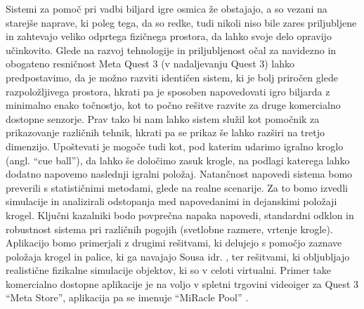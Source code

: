 \documentclass[a4paper, 12pt]{article}
\newcommand\cmnt[1]{\textcolor{munsell}{#1}}
\begin{document}
Sistemi za pomoč pri vadbi biljard igre osmica že obstajajo, a so vezani na starejše naprave, ki poleg tega, da so redke, tudi nikoli niso bile zares priljubljene \cite{Sousa2016} in zahtevajo veliko odprtega fizičnega prostora, da lahko svoje delo opravijo učinkovito. Glede na razvoj tehnologije in priljubljenost očal za navidezno in obogateno resničnost Meta Quest 3 (v nadaljevanju Quest 3) lahko predpostavimo, da je možno razviti identičen sistem, ki je bolj priročen glede razpoložljivega prostora, hkrati pa je sposoben napovedovati igro biljarda z minimalno enako točnostjo, kot to počno rešitve razvite za druge komercialno dostopne senzorje. Prav tako bi nam lahko sistem služil kot pomočnik za prikazovanje različnih tehnik, hkrati pa se prikaz še lahko razširi na tretjo dimenzijo. Upoštevati je mogoče tudi kot, pod katerim udarimo igralno kroglo (angl. ``cue ball''), da lahko še določimo zasuk krogle, na podlagi katerega lahko dodatno napovemo naslednji igralni položaj. 
Natančnost napovedi sistema bomo preverili s statističnimi metodami, glede na realne scenarije. Za to bomo izvedli simulacije in analizirali odstopanja med napovedanimi in dejanskimi položaji krogel. Ključni kazalniki bodo povprečna napaka napovedi, standardni odklon in robustnost sistema pri različnih pogojih (svetlobne razmere, vrtenje krogle). Aplikacijo bomo primerjali z drugimi rešitvami, ki delujejo s pomočjo zaznave položaja krogel in palice, ki ga navajajo Sousa idr. \cite{Sousa2016}, ter rešitvami, ki obljubljajo realistične fizikalne simulacije objektov, ki so v celoti virtualni. Primer take komercialno dostopne aplikacije je na voljo v spletni trgovini videoiger za Quest 3 ``Meta Store'', aplikacija pa se imenuje ``MiRacle Pool'' \cite{MiraclePool}. \\

\end{document}
